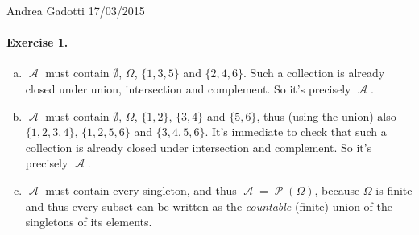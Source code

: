\documentclass[12pt,a4paper]{report}
\theoremstyle{definition}
\theoremstyle{num.custom-title}
\DeclareMathOperator{\A}{\mathcal{A}}
\DeclareMathOperator{\PP}{\mathcal{P}}
\renewcommand{\1}{\mathbbm{1}}
\begin{document}
\noindent Andrea Gadotti \hfill 17/03/2015

\paragraph{Exercise 1.}

\begin{enumerate}[(a)]
\item $\A$ must contain $\emptyset$, $\Omega$, $\{1,3,5\}$ and $\{2,4,6\}$. Such a collection is already closed under union, intersection and complement. So it's precisely $\A$.
\item $\A$ must contain $\emptyset$, $\Omega$, $\{1,2\}$, $\{3,4\}$ and $\{5,6\}$, thus (using the union) also $\{1,2,3,4\}$, $\{1,2,5,6\}$ and $\{3,4,5,6\}$. It's immediate to check that such a collection is already closed under intersection and complement. So it's precisely $\A$.
\item $\A$ must contain every singleton, and thus $\A = \PP(\Omega)$, because $\Omega$ is finite and thus every subset can be written as the \emph{countable} (finite) union of the singletons of its elements.
\end{enumerate}
\end{document}
